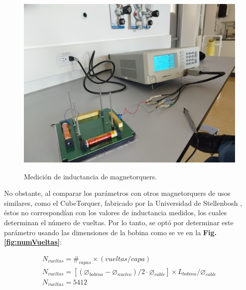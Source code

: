 \begin{figure}[h]
	\begin{center}
		\includegraphics[scale=0.07]{imagenes/modelo_dinamico/medicion_mgt.jpg}\\
	\end{center}
	\caption{Medición de inductancia de magnetorquers.}
	\label{fig:medicionH}
\end{figure}

No obstante, al comparar los parámetros con otros magnetorquers de usos similares, como el CubeTorquer, fabricado por la Universidad de Stellenbosh \cite{Groenewald2014}, éstos no correspondían con los valores de inductancia medidos, los cuales determinan el número de vueltas. Por lo tanto, se optó por determinar este parámetro usando las dimensiones de la bobina como se ve en la \textbf{Fig. \ref{fig:numVueltas}}:

\begin{gather}
	 N_{vueltas} = \#_{capas}\times \left(vueltas/capa\right)\label{key}\\[10pt]
	 N_{vueltas}= \left[\left(\diameter_{bobina}-\diameter_{nucleo}\right)/2\cdot \diameter_{cable} \right]\times L_{bobina} /\diameter_{cable}\\[10pt]
	 N_{vueltas}= 5412
\end{gather}

